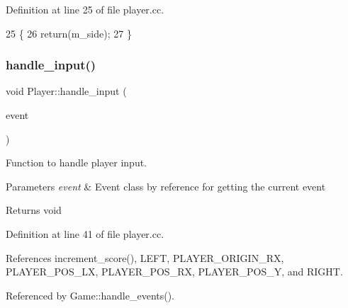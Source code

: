 Definition at line 25 of file player.\+cc.


\begin{DoxyCode}
25                       \{
26     \textcolor{keywordflow}{return}(m\_side);
27 \}
\end{DoxyCode}
\mbox{\label{class_player_a2a56f0d2037a44c56934c4faac06f54d}} 
\subsubsection{\texorpdfstring{handle\+\_\+input()}{handle\_input()}}
{\footnotesize\ttfamily void Player\+::handle\+\_\+input (\begin{DoxyParamCaption}\item[{sf\+::\+Event \&}]{event }\end{DoxyParamCaption})}



Function to handle player input. 


\begin{DoxyParams}{Parameters}
{\em event} & Event class by reference for getting the current event \\
\hline
\end{DoxyParams}
\begin{DoxyReturn}{Returns}
void 
\end{DoxyReturn}


Definition at line 41 of file player.\+cc.



References increment\+\_\+score(), L\+E\+FT, P\+L\+A\+Y\+E\+R\+\_\+\+O\+R\+I\+G\+I\+N\+\_\+\+RX, P\+L\+A\+Y\+E\+R\+\_\+\+P\+O\+S\+\_\+\+LX, P\+L\+A\+Y\+E\+R\+\_\+\+P\+O\+S\+\_\+\+RX, P\+L\+A\+Y\+E\+R\+\_\+\+P\+O\+S\+\_\+Y, and R\+I\+G\+HT.



Referenced by Game\+::handle\+\_\+events().


